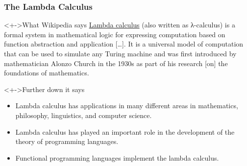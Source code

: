 \documentclass[pdftex,aspectratio=169]{beamer}
\subtitle
{Lambda Calculus}
\begin{document}
\begin{frame}
  \titlepage
\end{frame}



\begin{frame}[fragile]
  \frametitle{The Lambda Calculus}
\begin{block}<+->{What Wikipedia says}
  \href{https://en.wikipedia.org/wiki/Lambda_calculus}{Lambda
    calculus} (also written as λ-calculus) is a formal system in
  mathematical logic for expressing computation based on function
  abstraction and application [\dots]. It is a universal model of
  computation that can be used to simulate any Turing machine and was
  first introduced by mathematician Alonzo Church in the 1930s as part
  of his research [on] the foundations of mathematics.  
\end{block}
\begin{block}<+->{Further down it says}
  \begin{itemize}
  \item[\textcolor{green}\cmark] Lambda calculus has applications in many different areas in mathematics, philosophy, linguistics, and computer science.
  \item[\textcolor{green}\cmark] Lambda calculus has played an important role in the development of the theory of programming languages.
  \item[\textcolor{red}\xmark] Functional programming languages implement the lambda calculus.
  \end{itemize}
\end{block}
\end{frame}             
\end{document}
